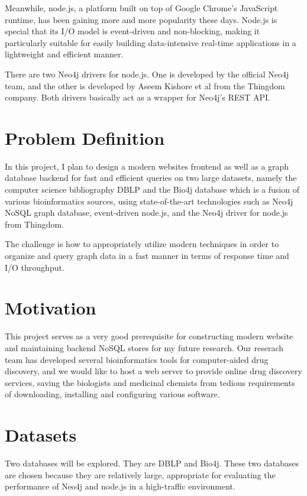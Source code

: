 \documentclass[10pt, conference, compsocconf]{../IEEEtran}
\begin{document}
Meanwhile, node.js, a platform built on top of Google Chrome's JavaScript runtime, has been gaining more and more popularity these days. Node.js is special that its I/O model is event-driven and non-blocking, making it particularly suitable for easily building data-intensive real-time applications in a lightweight and efficient manner. 

There are two Neo4j drivers for node.js. One is developed by the official Neo4j team, and the other is developed by Aseem Kishore et al from the Thingdom company. Both drivers basically act as a wrapper for Neo4j's REST API.

\section{Problem Definition}

In this project, I plan to design a modern websites frontend as well as a graph database backend for fast and efficient queries on two large datasets, namely the computer science bibliography DBLP \citep{ley2006maintaining,Ley:2009:DLL:1687553.1687577} and the Bio4j database which is a fusion of various bioinformatics sources, using state-of-the-art technologies such as Neo4j NoSQL graph database, event-driven node.js, and the Neo4j driver for node.js from Thingdom.

The challenge is how to appropriately utilize modern techniques in order to organize and query graph data in a fast manner in terms of response time and I/O throughput.

\section{Motivation}

This project serves as a very good prerequisite for constructing modern website and maintaining backend NoSQL stores for my future research. Our reserach team has developed several bioinformatics tools for computer-aided drug discovery, and we would like to host a web server to provide online drug discovery services, saving the biologists and medicinal chemists from tedious requirements of downloading, installing and configuring various software.

\section{Datasets}

Two databases will be explored. They are DBLP and Bio4j. These two databases are chosen because they are relatively large, appropriate for evaluating the performance of Neo4j and node.js in a high-traffic environment.
\end{document}
